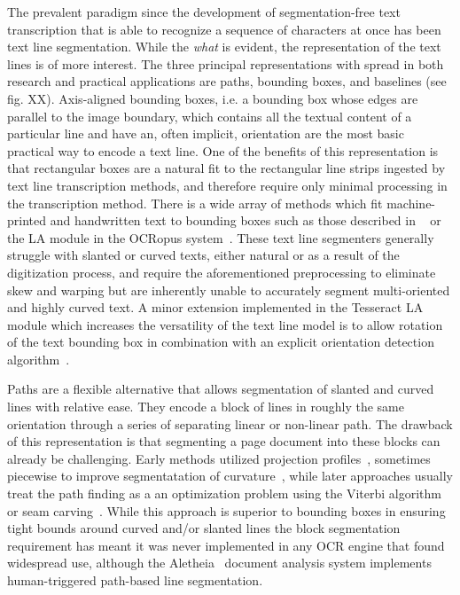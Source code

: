The prevalent paradigm since the development of segmentation-free text
transcription that is able to recognize a sequence of characters at once has
been text line segmentation. While the \emph{what} is evident, the
representation of the text lines is of more interest. The three principal
representations with spread in both research and practical applications are
paths, bounding boxes, and baselines (see fig. XX). Axis-aligned bounding
boxes, i.e. a bounding box whose edges are parallel to the image boundary,
which contains all the textual content of a particular line and have an, often
implicit, orientation are the most basic practical way to encode a text line.
One of the benefits of this representation is that rectangular boxes are a
natural fit to the rectangular line strips ingested by text line transcription
methods, and therefore require only minimal processing in the transcription
method. There is a wide array of methods which fit machine-printed and
handwritten text to bounding boxes such as those described in
~\cite{marti2001influence,papavassiliou2010handwritten} or the LA module in the
OCRopus system~\cite{Breuel03highperformance}. These text line segmenters
generally struggle with slanted or curved texts, either natural or as a result
of the digitization process, and require the aforementioned preprocessing to
eliminate skew and warping but are inherently unable to accurately segment
multi-oriented and highly curved text. A minor extension implemented in the
Tesseract LA module which increases the versatility of the text line model is
to allow rotation of the text bounding box in combination with an explicit
orientation detection algorithm~\cite{smith2007overview}.

Paths are a flexible alternative that allows segmentation of slanted and curved
lines with relative ease. They encode a block of lines in roughly the same
orientation through a series of separating linear or non-linear path. The
drawback of this representation is that segmenting a page document into
these blocks can already be challenging. Early methods utilized projection
profiles~\cite{antonacopoulos2004document}, sometimes piecewise to improve
segmentatation of curvature~\cite{zahour2001arabic}, while later approaches
usually treat the path finding as a an optimization problem using the Viterbi
algorithm~\cite{tseng1999recognition} or seam carving~\cite{arvanitopoulos2014seam,zhang2014text}. While this approach is superior to
bounding boxes in ensuring tight bounds around curved and/or slanted lines the
block segmentation requirement has meant it was never implemented in any OCR
engine that found widespread use, although the Aletheia~\cite{6065274} document
analysis system implements human-triggered path-based line segmentation.

